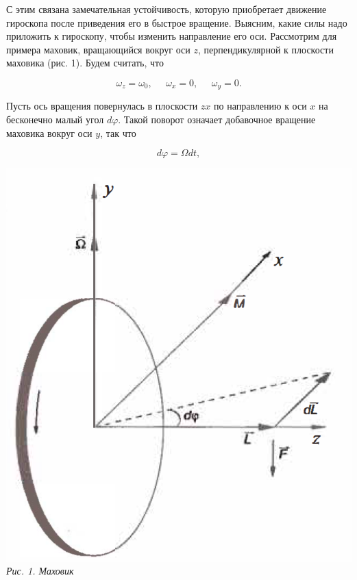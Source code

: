 \documentclass[12pt, a4paper]{article}
\begin{document}
\noindent\begin{minipage}[c]{0.4\textwidth}
    \hspace{1cm}
    С этим связана замечательная устойчивость, которую приобретает движение гироскопа после приведения его в быстрое вращение. 
Выясним, какие силы надо приложить к гироскопу, чтобы изменить 
направление его оси. Рассмотрим для 
примера маховик, вращающийся вокруг оси $ z $, перпендикулярной к плоскости маховика (рис. 1). Будем считать, что

\begin{equation}
    \omega_z = \omega_0, \;\;\;\;\; \omega_x = 0, \;\;\;\;\; \omega_y = 0.
    \end{equation}
    
    \noindent Пусть ось вращения повернулась в плоскости $ zx $ по направлению к оси $ x $ на бесконечно малый угол $ d\varphi $. Такой поворот означает добавочное вращение маховика вокруг оси $ y $, так что

    \begin{equation}
    d\varphi=\Omega dt,
    \end{equation}

\end{minipage}
\begin{minipage}[c]{0.57\textwidth}
    \begin{center}
        \includegraphics[scale=0.58]{Pics/picture1.png} \\
        \textit{\textcolor[HTML]{000000}{Рис. 1. Маховик}}
    \end{center}
\end{minipage}  
\end{document}
